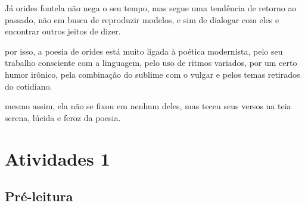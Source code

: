 \documentclass[12pt]{extarticle}
\begin{document}
Já orides fontela não nega o seu tempo,
mas segue uma tendência de retorno ao passado,
não em busca de reproduzir modelos, e sim de dialogar com eles e encontrar outros jeitos de dizer.

por isso, a poesia de orides está muito ligada à poética modernista, pelo seu trabalho consciente com a linguagem,
pelo uso de ritmos variados,
por um certo humor irônico,
pela combinação do sublime com o vulgar
e pelos temas retirados do cotidiano.

mesmo assim, ela não se fixou em nenhum deles, mas teceu seus versos na teia serena, lúcida e feroz da poesia.


	
\section{Atividades 1}


\subsection{Pré-leitura}

\end{document}
